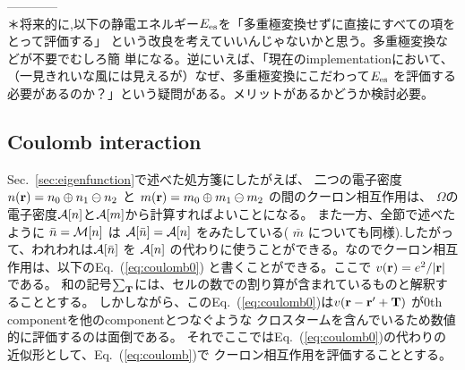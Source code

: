 \documentclass[twocolumn,showpacs,preprintnumbers,amsmath,amssymb,floatfix]{revtex4-1}
\newcommand{\bfr}{{\bf r}}
\newcommand{\bfT}{{\bf T}}
\def\calR{{\cal A}}
\newcommand{\req}[1]{\mbox{Eq.~\!(\ref{#1})}}
\newcommand{\refsec}[1]{\mbox{Sec.~\!\ref{#1}}}
\def\MM{{\cal M}}
\def\MM{{\cal M}}
\begin{document}
------------\\
＊将来的に,以下の静電エネルギー$E_{\rm es}$を「多重極変換せずに直接にすべての項をとって評価する」
という改良を考えていいんじゃないかと思う。多重極変換などが不要でむしろ簡
単になる。逆にいえば、「現在のimplementationにおいて、
（一見きれいな風には見えるが）なぜ、多重極変換にこだわって$E_{\rm es}$
を評価する必要があるのか？」という疑問がある。メリットがあるかどうか検討必要。

\subsection{Coulomb interaction}
\label{sec:coulomb} 
\refsec{sec:eigenfunction}で述べた処方箋にしたがえば、
二つの電子密度$n(\bfr)=n_0\oplus n_1 \ominus n_2$ と
$m(\bfr)=m_0 \oplus m_1 \ominus m_2$  の間のクーロン相互作用は、
$\Omega$の電子密度$\calR[n]$と$\calR[m]$から計算すればよいことになる。
また一方、全節で述べたように
$\bar{n}=\MM[n]$ は $\calR[\bar{n}]=\calR[n]$ をみたしている( $\bar{m}$
についても同様).したがって、われわれは$\calR[\bar{n}]$ を $\calR[n]$ 
の代わりに使うことができる。なのでクーロン相互作用は、以下の\req{eq:coulomb0}
と書くことができる。ここで $v(\bfr)=e^2/|\bfr|$である。
和の記号$\sum_{\bfT}$には、セルの数での割り算が含まれているものと解釈することとする。
しかしながら、この\req{eq:coulomb0}は$v(\bfr-\bfr'+\bfT)$
が0th componentを他のcomponentとつなぐような
クロスタームを含んでいるため数値的に評価するのは面倒である。
それでここでは\req{eq:coulomb0}の代わりの近似形として、\req{eq:coulomb}で
クーロン相互作用を評価することとする。
\end{document}

